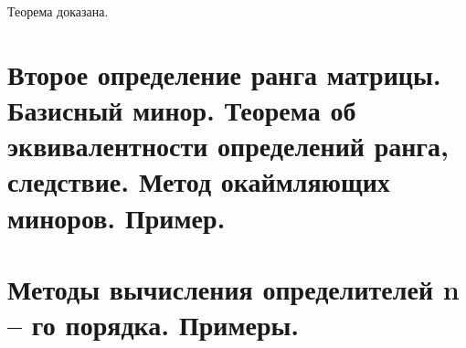 \documentclass{article}
\begin{document}
Теорема доказана.

\newpage
\section{Второе определение ранга матрицы. Базисный минор. Теорема об эквивалентности определений ранга, следствие. Метод окаймляющих миноров. Пример.}

\newpage
\section{Методы вычисления определителей n – го порядка. Примеры.}


 
\end{document}
